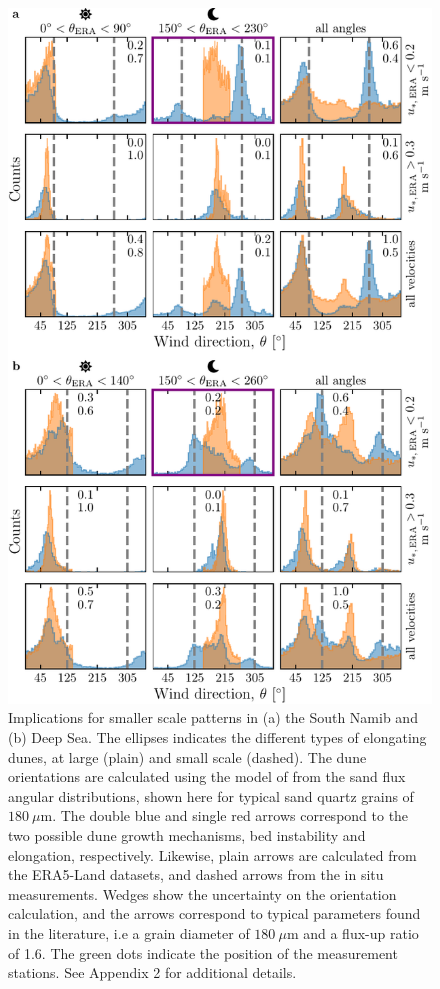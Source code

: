 \begin{figure}
  \centering
  \includegraphics[scale=1]{Figures/Figure6.pdf}
  \caption{Implications for smaller scale patterns in (a) the South Namib and (b) Deep Sea. The ellipses indicates the different types of elongating dunes, at large (plain) and small scale (dashed). The dune orientations are calculated using the model of \citet{Courrech2014} from the sand flux angular distributions, shown here for typical sand quartz grains of $180~\mu$m. The double blue and single red arrows correspond to the two possible dune growth mechanisms, bed instability and elongation, respectively. Likewise, plain arrows are calculated from the ERA5-Land datasets, and dashed arrows from the in situ measurements. Wedges show the uncertainty on the orientation calculation, and the arrows correspond to typical parameters found in the literature, i.e a grain diameter of $180~\mu$m and a flux-up ratio of 1.6. The green dots indicate the position of the measurement stations. See Appendix 2 for additional details.}
  \label{Fig6}
\end{figure}

